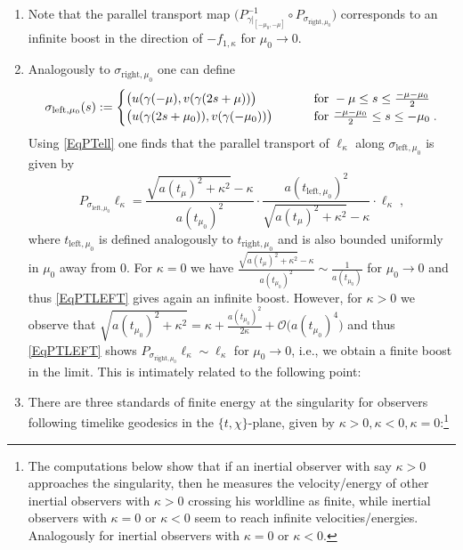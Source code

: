 \documentclass[reqno]{article}
\begin{document}
\begin{remark} \label{RemFLRW}
\begin{enumerate}
\item Note that the parallel transport map $\big(P^{-1}_{\gamma|_{[-\mu_0,-\mu]}} \circ P_{\sigma_{\mathrm{right}, \mu_0}}\big)$ corresponds to an infinite boost in the direction of $-f_{1,\kappa}$ for $\mu_0 \to 0$.


\item Analogously to $\sigma_{\mathrm{right}, \mu_0}$ one can define $$\sigma_{\mathrm{left}, \mu_0} (s) := \begin{cases} \big(u(\gamma(-\mu), v(\gamma(2s + \mu))\big) \qquad &\textnormal{ for } - \mu \leq s \leq \frac{-\mu - \mu_0}{2} \\
\big(u(\gamma(2s +\mu_0)), v(\gamma(-\mu_0))\big) \qquad &\textnormal{ for } \frac{-\mu - \mu_0}{2} \leq s \leq -\mu_0 \;. \end{cases} $$
Using \eqref{EqPTell} one finds that the parallel transport of $\ell_\kappa$ along $\sigma_{\mathrm{left}, \mu_0}$ is given by 
\begin{equation}\label{EqPTLEFT}
P_{\sigma_{\mathrm{left}, \mu_0}} \ell_\kappa = \frac{\sqrt{a(t_\mu)^2 + \kappa^2} - \kappa}{a(t_{\mu_0})^2} \cdot \frac{a(t_{\mathrm{left}, \mu_0})^2}{\sqrt{a(t_\mu)^2 + \kappa^2} - \kappa} \cdot \ell_\kappa\;,
\end{equation}
where $t_{\mathrm{left}, \mu_0}$ is defined analogously to $t_{\mathrm{right}, \mu_0}$ and is also bounded uniformly in $\mu_0$ away from $0$. For $\kappa = 0$ we have $\frac{\sqrt{a(t_\mu)^2 + \kappa^2} - \kappa}{a(t_{\mu_0})^2}  \sim \frac{1}{a(t_{\mu_0})}$ for $\mu_0 \to 0$ and thus \eqref{EqPTLEFT} gives again an infinite boost. However, for $\kappa >0$ we observe that $\sqrt{a(t_{\mu_0})^2 + \kappa^2} = \kappa + \frac{a(t_{\mu_0})^2}{2\kappa} + \mathcal{O}\big(a(t_{\mu_0})^4\big) $ and thus \eqref{EqPTLEFT} shows $P_{\sigma_{\mathrm{right}, \mu_0}} \ell_\kappa \sim \ell_\kappa$ for $\mu_0 \to 0$, i.e., we obtain a finite boost in the limit. This is intimately related to the following point:
\item There are three standards of finite energy at the singularity for observers following timelike geodesics in the $\{t,\chi\}$-plane, given by $\kappa >0, \kappa <0, \kappa = 0$:\footnote{The computations below show that if an inertial observer with say $\kappa >0$ approaches the singularity, then he measures the velocity/energy of other inertial observers with $\kappa >0$ crossing his worldline  as finite, while inertial observers with $\kappa = 0$ or $\kappa <0$ seem to reach infinite velocities/energies. Analogously for inertial observers with $\kappa = 0$ or $\kappa <0$.}

\end{enumerate}
\end{remark}
\end{document}
